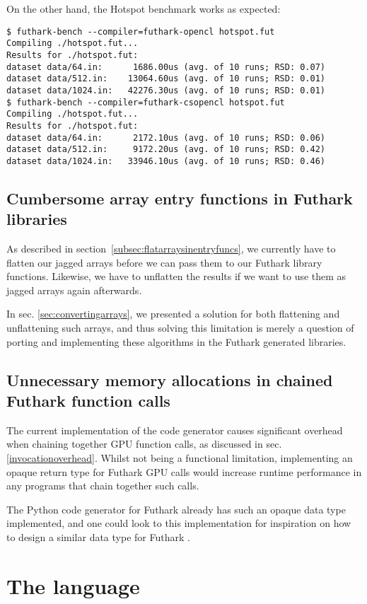On the other hand, the Hotspot benchmark works as expected:
\begin{verbatim}
$ futhark-bench --compiler=futhark-opencl hotspot.fut  
Compiling ./hotspot.fut...
Results for ./hotspot.fut:
dataset data/64.in:      1686.00us (avg. of 10 runs; RSD: 0.07)
dataset data/512.in:    13064.60us (avg. of 10 runs; RSD: 0.01)
dataset data/1024.in:   42276.30us (avg. of 10 runs; RSD: 0.01)
$ futhark-bench --compiler=futhark-csopencl hotspot.fut
Compiling ./hotspot.fut...
Results for ./hotspot.fut:
dataset data/64.in:      2172.10us (avg. of 10 runs; RSD: 0.06)
dataset data/512.in:     9172.20us (avg. of 10 runs; RSD: 0.42)
dataset data/1024.in:   33946.10us (avg. of 10 runs; RSD: 0.46)
\end{verbatim}



\subsection{Cumbersome array entry functions in Futhark libraries}
\label{cumbersomearrays}
As described in section~\ref{subsec:flatarraysinentryfuncs}, we currently have to
flatten our jagged arrays before we can pass them to our Futhark library
functions. Likewise, we have to unflatten the results if we want to use them as
jagged arrays again afterwards.

In sec. \ref{sec:convertingarrays}, we presented a solution for both flattening
and unflattening such arrays, and thus solving this limitation is merely a
question of porting and implementing these algorithms in the Futhark generated
\csharp{} libraries.

\subsection{Unnecessary memory allocations in chained Futhark function calls}
The current implementation of the code generator causes significant overhead
when chaining together GPU function calls, as discussed in sec.
\ref{invocationoverhead}.
Whilst not being a functional limitation, implementing an
opaque return type for Futhark GPU calls would increase runtime
performance in any programs that chain together such calls.

The Python code generator for Futhark already has such an opaque data type
implemented, and one could look to this implementation for inspiration on how to
design a similar data type for Futhark \csharp{}.

\section{The \fshark{} language}
